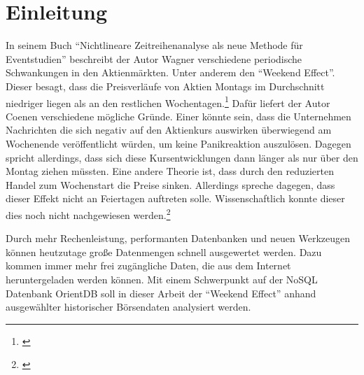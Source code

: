\section{Einleitung}


In seinem Buch \enquote{Nichtlineare Zeitreihenanalyse als neue Methode für Eventstudien} beschreibt der Autor Wagner verschiedene periodische Schwankungen in den Aktienmärkten. Unter anderem den \enquote{Weekend Effect}. Dieser besagt, dass die Preisverläufe von Aktien Montags im Durchschnitt niedriger liegen als an den restlichen Wochentagen.\footnote{\cite[Vgl.][17]{Wagner2019}} Dafür liefert der Autor Coenen verschiedene mögliche Gründe. Einer könnte sein, dass die Unternehmen Nachrichten die sich negativ auf den Aktienkurs auswirken überwiegend am Wochenende veröffentlicht würden, um keine Panikreaktion auszulösen. Dagegen spricht allerdings, dass sich diese Kursentwicklungen dann länger als nur über den Montag ziehen müssten. Eine andere Theorie ist, dass durch den reduzierten Handel zum Wochenstart die Preise sinken. Allerdings spreche dagegen, dass dieser Effekt nicht an Feiertagen auftreten solle. Wissenschaftlich konnte dieser dies noch nicht nachgewiesen werden.\footnote{\cite[Vgl.][8]{Coenen2020}}

Durch mehr Rechenleistung, performanten Datenbanken und neuen Werkzeugen können heutzutage große Datenmengen schnell ausgewertet werden. Dazu kommen immer mehr frei zugängliche Daten, die aus dem Internet heruntergeladen werden können. Mit einem Schwerpunkt auf der NoSQL Datenbank OrientDB soll in dieser Arbeit der \enquote{Weekend Effect} anhand ausgewählter historischer Börsendaten analysiert werden.

\clearpage